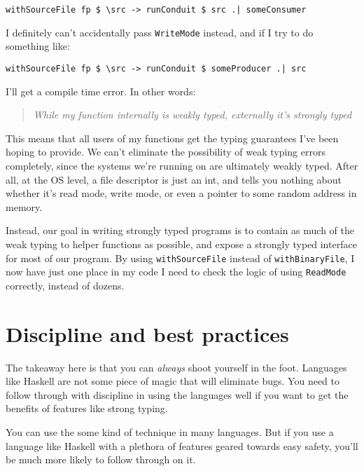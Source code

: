 \begin{verbatim}
withSourceFile fp $ \src -> runConduit $ src .| someConsumer
\end{verbatim}
I definitely can't accidentally pass \texttt{WriteMode} instead, and if I try to do something like:

\begin{verbatim}
withSourceFile fp $ \src -> runConduit $ someProducer .| src
\end{verbatim}
I'll get a compile time error. In other words:
\begin{quotation}
 \textit{While my function internally is weakly typed, externally it's strongly typed }
\end{quotation}
This means that all users of my functions get the typing guarantees I've been hoping to provide. We can't eliminate the possibility of weak typing errors completely, since the systems we're running on are ultimately weakly typed. After all, at the OS level, a file descriptor is just an int, and tells you nothing about whether it's read mode, write mode, or even a pointer to some random address in memory.

Instead, our goal in writing strongly typed programs is to contain as much of the weak typing to helper functions as possible, and expose a strongly typed interface for most of our program. By using \texttt{withSourceFile} instead of \texttt{withBinaryFile}, I now have just one place in my code I need to check the logic of using \texttt{ReadMode} correctly, instead of dozens.

\section{Discipline and best practices}

The takeaway here is that you can \textit{always} shoot yourself in the foot. Languages like Haskell are not some piece of magic that will eliminate bugs. You need to follow through with discipline in using the languages well if you want to get the benefits of features like strong typing.

You can use the some kind of technique in many languages. But if you use a language like Haskell with a plethora of features geared towards easy safety, you'll be much more likely to follow through on it.

